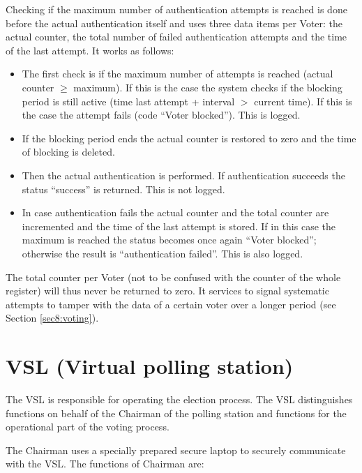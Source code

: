 Checking if the maximum number of authentication attempts is reached
is done before the actual authentication itself and uses three data
items per Voter: the actual counter, the total number of failed
authentication attempts and the time of the last attempt. It works as follows:

\begin{itemize}

	\item The first check is if the maximum number of attempts is
	reached (actual counter $\geq$ maximum). If this is the case
	the system checks if the blocking period is still active (time
	last attempt + interval $>$ current time). If this is the case
	the attempt fails (code ``Voter blocked''). This is logged.

	\item If the blocking period ends the actual counter is
	restored to zero and the time of blocking is deleted.

	\item Then the actual authentication is performed. If
	authentication succeeds the status ``success'' is
	returned. This is not logged.

	\item In case authentication fails the actual counter and the
	total counter are incremented and the time of the last attempt
	is stored. If in this case the maximum is reached the status
	becomes once again ``Voter blocked''; otherwise the result is
	``authentication failed''. This is also logged.

\end{itemize}

The total counter per Voter (not to be confused with the counter of
the whole register) will thus never be returned to zero. It services
to signal systematic attempts to tamper with the data of a certain
voter over a longer period (see Section \ref{sec8:voting}).

\section{VSL (Virtual polling station)}\label{sec2:vslv-poll-stat}

The VSL is responsible for operating the election process. The VSL
distinguishes functions on behalf of the Chairman of the polling
station and functions for the operational part of the voting process.

The Chairman uses a specially prepared secure laptop to securely
communicate with the VSL. The functions of Chairman are:

